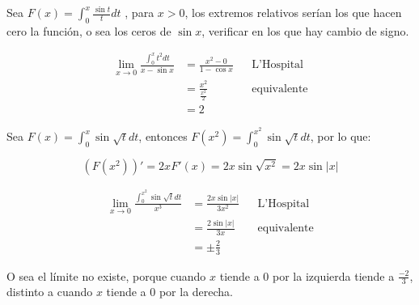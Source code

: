 \documentclass[14pt]{extarticle}
\begin{document}
Sea $F(x) = \int^x_0 \frac{\sin t}{t} dt$ , para $x> 0$, los extremos relativos serían los que hacen cero la función, o sea los ceros de $\sin x$, verificar en los que hay cambio de signo.

\begin{align}
      \lim_{x \to 0} \frac{\int^x_0 t^2 dt }{x - \sin x}
      & =   \frac{x^2 - 0}{1 - \cos x}  && \text{L'Hospital} \\
      & = \frac{x^2}{\frac{x^2}{2}} && \text{equivalente} \\
      & = 2
\end{align}

Sea $F(x) = \int^x_0 \sin \sqrt{t} dt$, entonces $F(x^2) = \int^{x^2}_0 \sin \sqrt{t} dt$, por lo que:

$$
(F(x^2))' = 2xF'(x) = 2x\sin \sqrt{x^2} = 2x \sin \vert x \vert
$$

\begin{align}
      \lim_{x \to 0} \frac{\int^{x^2}_0 \sin \sqrt{t} dt }{x^3}
      & =   \frac{2x \sin \vert x \vert}{3x^2}  && \text{L'Hospital} \\
      & = \frac{2\sin \vert x \vert}{3x} && \text{equivalente} \\
      & = \pm \frac{2}{3}
\end{align}

O sea el límite no existe, porque cuando $x$ tiende a $0$ por la izquierda tiende a $\frac{-2}{3}$, distinto a cuando $x$ tiende a $0$ por la derecha.
\end{document}
